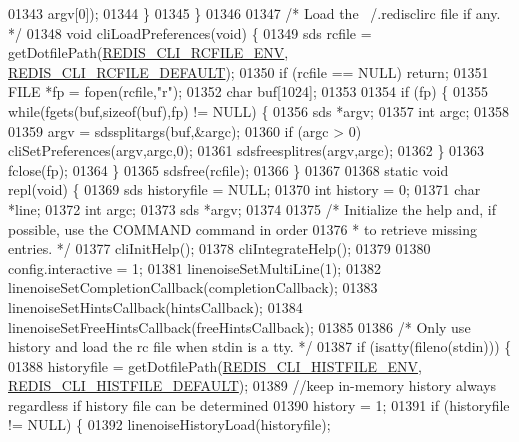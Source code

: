 \begin{DoxyCode}
{{{{{{{{{{{{{{{{{{{{{{{{{{{{{{{{{{{{01343             argv[0]);
01344     \}
01345 \}
01346 
01347 \textcolor{comment}{/* Load the ~/.redisclirc file if any. */}
01348 \textcolor{keywordtype}{void} cliLoadPreferences(\textcolor{keywordtype}{void}) \{
01349     sds rcfile = getDotfilePath(\hyperlink{redis-cli_8c_abb8e34d308514b1e024e39d127046df0}{REDIS\_CLI\_RCFILE\_ENV},
      \hyperlink{redis-cli_8c_a0764031c702054d021e64f66271b56e3}{REDIS\_CLI\_RCFILE\_DEFAULT});
01350     \textcolor{keywordflow}{if} (rcfile == NULL) \textcolor{keywordflow}{return};
01351     FILE *fp = fopen(rcfile,\textcolor{stringliteral}{"r"});
01352     \textcolor{keywordtype}{char} buf[1024];
01353 
01354     \textcolor{keywordflow}{if} (fp) \{
01355         \textcolor{keywordflow}{while}(fgets(buf,\textcolor{keyword}{sizeof}(buf),fp) != NULL) \{
01356             sds *argv;
01357             \textcolor{keywordtype}{int} argc;
01358 
01359             argv = sdssplitargs(buf,&argc);
01360             \textcolor{keywordflow}{if} (argc > 0) cliSetPreferences(argv,argc,0);
01361             sdsfreesplitres(argv,argc);
01362         \}
01363         fclose(fp);
01364     \}
01365     sdsfree(rcfile);
01366 \}
01367 
01368 \textcolor{keyword}{static} \textcolor{keywordtype}{void} repl(\textcolor{keywordtype}{void}) \{
01369     sds historyfile = NULL;
01370     \textcolor{keywordtype}{int} history = 0;
01371     \textcolor{keywordtype}{char} *line;
01372     \textcolor{keywordtype}{int} argc;
01373     sds *argv;
01374 
01375     \textcolor{comment}{/* Initialize the help and, if possible, use the COMMAND command in order}
01376 \textcolor{comment}{     * to retrieve missing entries. */}
01377     cliInitHelp();
01378     cliIntegrateHelp();
01379 
01380     config.interactive = 1;
01381     linenoiseSetMultiLine(1);
01382     linenoiseSetCompletionCallback(completionCallback);
01383     linenoiseSetHintsCallback(hintsCallback);
01384     linenoiseSetFreeHintsCallback(freeHintsCallback);
01385 
01386     \textcolor{comment}{/* Only use history and load the rc file when stdin is a tty. */}
01387     \textcolor{keywordflow}{if} (isatty(fileno(stdin))) \{
01388         historyfile = getDotfilePath(\hyperlink{redis-cli_8c_a4aaf4b657b3305064e3da87ac88a95f9}{REDIS\_CLI\_HISTFILE\_ENV},
      \hyperlink{redis-cli_8c_ab1ba16fc9e98d602260f42a49de9a61c}{REDIS\_CLI\_HISTFILE\_DEFAULT});
01389         \textcolor{comment}{//keep in-memory history always regardless if history file can be determined}
01390         history = 1;
01391         \textcolor{keywordflow}{if} (historyfile != NULL) \{
01392             linenoiseHistoryLoad(historyfile);
}}}}}}}}}}}}}}}}}}}}}}}}}}}}}}}}}}}}
\end{DoxyCode}
